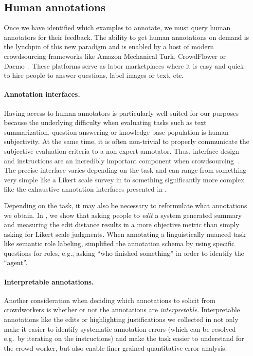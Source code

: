 \subsection{Human annotations}
Once we have identified which examples to annotate, we must query human annotators for their feedback.
The ability to get human annotations on demand is the lynchpin of this new paradigm and is enabled by a host of modern crowdsourcing frameworks like Amazon Mechanical Turk, CrowdFlower or Daemo~\cite{}.
These platforms serve as labor marketplaces where it is easy and quick to hire people to answer questions, label images or text, etc.

\paragraph{Annotation interfaces.}
Having access to human annotators is particularly well suited for our purposes because the underlying difficulty when evaluating tasks such as text summarization, question answering or knowledge base population is human subjectivity.
At the same time, it is often non-trivial to properly communicate the subjective evaluation criteria to a non-expert annotator.
Thus, interface design and instructions are an incredibly important component when crowdsourcing~\citep{}.
The precise interface varies depending on the task and can range from something very simple like a Likert scale survey in  to something significantly more complex like the exhaustive annotation interfaces presented in .

Depending on the task, it may also be necessary to reformulate what annotations we obtain.
In , we show that asking people to \textit{edit} a system generated summary and measuring the edit distance results in a more objective metric than simply asking for Likert scale judgments.
When annotating a linguistically nuanced task like semantic role labeling, \citet{} simplified the annotation schema by using specific questions for roles, e.g., asking ``who finished something'' in order to identify the ``agent''.

\paragraph{Interpretable annotations.}
Another consideration when deciding which annotations to solicit from crowdworkers is whether or not the annotations are \textit{interpretable}.
Interpretable annotations like the edits or highlighting justifications we collected in  not only make it easier to identify systematic annotation errors (which can be resolved e.g.\ by iterating on the instructions) and make the task easier to understand for the crowd worker, but also enable finer grained quantitative error analysis.

